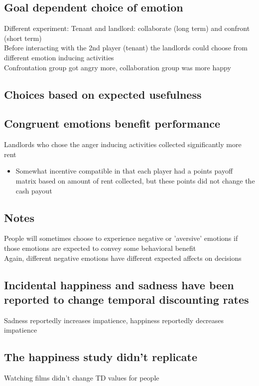 \subsection{Goal dependent choice of emotion}
Different experiment: Tenant and landlord: collaborate (long term) and confront (short term)
\\Before interacting with the 2nd player (tenant) the landlords could choose from different emotion inducing
activities
\\Confrontation group got angry more, collaboration group was more happy

\subsection{Choices based on expected usefulness}
\subsection{Congruent emotions benefit performance}
Landlords who chose the anger inducing activities collected significantly more rent
\begin{itemize}
    \item Somewhat incentive compatible in that each player had a points payoff matrix based on amount  of rent collected, but these points did not change the cash payout
\end{itemize}

\subsection{Notes}
People will sometimes choose to experience negative or 'aversive' emotions if those emotions are expected to convey some behavioral benefit
\\Again, different negative emotions have different expected affects on decisions
\subsection{Incidental happiness and sadness have been reported to change temporal discounting rates}
Sadness reportedly increases impatience, happiness reportedly decreases impatience

\subsection{The happiness study didn't replicate}
Watching films didn't change TD values for people


